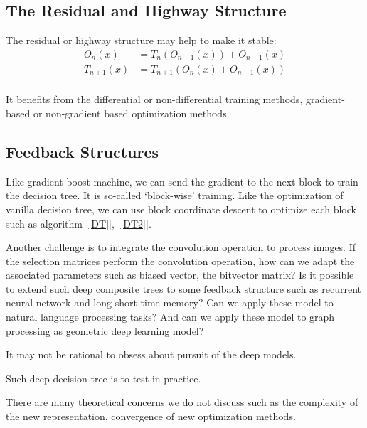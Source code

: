 \documentclass[UTF8]{article}
\begin{document}
\subsection{The Residual and Highway Structure}

The  residual or highway structure may help to make it stable:
\begin{equation}\label{Res}
  \begin{split}
    O_n(x) &=T_n(O_{n-1}(x))+ O_{n-1}(x)\\ \nonumber
    T_{n+1}(x)&= T_{n+1}(O_{n}(x) + O_{n-1}(x))\\ \nonumber
  \end{split}
\end{equation}


It benefits from the differential or non-differential training methods, gradient-based or non-gradient based
optimization methods.

\subsection{Feedback Structures}

Like gradient boost machine, we can send the gradient to the next block to train the decision tree.
It is so-called `block-wise' training.
Like the optimization of vanilla decision tree,
we can use block coordinate descent to optimize each  block such as algorithm [\ref{DT}], [\ref{DT2}].

Another challenge is to integrate the convolution operation to process images.
If the selection matrices perform the convolution operation,
how can we adapt the associated parameters such as biased vector, the bitvector matrix?
Is it possible to extend such deep composite trees to some feedback structure
such as recurrent neural network and long-short time memory?
Can we apply these model to natural language processing tasks?
And can we apply these model to graph processing as geometric deep learning model?

It may not be rational to obsess about pursuit of the deep models.

Such deep decision tree is to test in practice.


There are many theoretical concerns we do not discuss such as
the complexity  of the new representation, convergence of new optimization methods.
\fi
\end{document}
